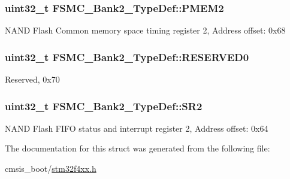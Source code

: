 \subsubsection[{\texorpdfstring{P\+M\+E\+M2}{PMEM2}}]{ uint32\+\_\+t F\+S\+M\+C\+\_\+\+Bank2\+\_\+\+Type\+Def\+::\+P\+M\+E\+M2}\hypertarget{struct_f_s_m_c___bank2___type_def_a29b2b75e74520e304e31c18cf9e4a7f8}{}\label{struct_f_s_m_c___bank2___type_def_a29b2b75e74520e304e31c18cf9e4a7f8}
N\+A\+ND Flash Common memory space timing register 2, Address offset\+: 0x68 
\subsubsection[{\texorpdfstring{R\+E\+S\+E\+R\+V\+E\+D0}{RESERVED0}}]{\setlength{\rightskip}{0pt plus 5cm}uint32\+\_\+t F\+S\+M\+C\+\_\+\+Bank2\+\_\+\+Type\+Def\+::\+R\+E\+S\+E\+R\+V\+E\+D0}\hypertarget{struct_f_s_m_c___bank2___type_def_ac0433330a92f2bd04812384f63bb4a52}{}\label{struct_f_s_m_c___bank2___type_def_ac0433330a92f2bd04812384f63bb4a52}
Reserved, 0x70 
\subsubsection[{\texorpdfstring{S\+R2}{SR2}}]{ uint32\+\_\+t F\+S\+M\+C\+\_\+\+Bank2\+\_\+\+Type\+Def\+::\+S\+R2}\hypertarget{struct_f_s_m_c___bank2___type_def_a38ad7403e05c899dc266cf47f932cc8f}{}\label{struct_f_s_m_c___bank2___type_def_a38ad7403e05c899dc266cf47f932cc8f}
N\+A\+ND Flash F\+I\+FO status and interrupt register 2, Address offset\+: 0x64 

The documentation for this struct was generated from the following file\+:\begin{DoxyCompactItemize}
\item 
cmsis\+\_\+boot/\hyperlink{stm32f4xx_8h}{stm32f4xx.\+h}\end{DoxyCompactItemize}
